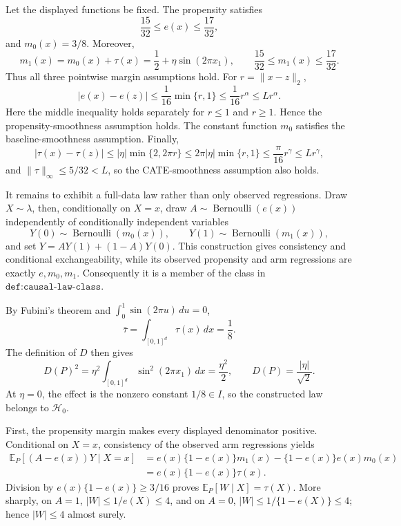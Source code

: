 Let the displayed functions be fixed. The propensity satisfies
\[
  \frac{15}{32}\le e(x)\le\frac{17}{32},
\]
and \(m_0(x)=3/8\). Moreover,
\[
  m_1(x)=m_0(x)+\tau(x)=\frac12+\eta\sin(2\pi x_1),
  \qquad
  \frac{15}{32}\le m_1(x)\le\frac{17}{32}.
\]
Thus all three pointwise margin assumptions hold. For \(r=\lVert x-z\rVert_2\),
\[
 |e(x)-e(z)|\le \frac1{16}\min\{r,1\}\le \frac1{16}r^\alpha\le Lr^\alpha.
\]
Here the middle inequality holds separately for \(r\le1\) and \(r\ge1\). Hence the propensity-smoothness assumption holds. The constant function \(m_0\) satisfies the baseline-smoothness assumption. Finally,
\[
 |\tau(x)-\tau(z)|
 \le |\eta|\min\{2,2\pi r\}
 \le 2\pi|\eta|\min\{r,1\}
 \le \frac{\pi}{16}r^\gamma
 \le Lr^\gamma,
\]
and \(\lVert\tau\rVert_\infty\le5/32<L\), so the CATE-smoothness assumption also holds.

It remains to exhibit a full-data law rather than only observed regressions. Draw \(X\sim\lambda\), then, conditionally on \(X=x\), draw \(A\sim\operatorname{Bernoulli}(e(x))\) independently of conditionally independent variables
\[
 Y(0)\sim\operatorname{Bernoulli}(m_0(x)),
 \qquad
 Y(1)\sim\operatorname{Bernoulli}(m_1(x)),
\]
and set \(Y=AY(1)+(1-A)Y(0)\). This construction gives consistency and conditional exchangeability, while its observed propensity and arm regressions are exactly \(e,m_0,m_1\). Consequently it is a member of the class in \(\texttt{def:causal-law-class}\).

By Fubini's theorem and \(\int_0^1\sin(2\pi u)\,du=0\),
\[
 \bar\tau=\int_{[0,1]^d}\tau(x)\,dx=\frac18.
\]
The definition of \(D\) then gives
\[
 D(P)^2
 =\eta^2\int_{[0,1]^d}\sin^2(2\pi x_1)\,dx
 =\frac{\eta^2}{2},
 \qquad
 D(P)=\frac{|\eta|}{\sqrt2}.
\]
At \(\eta=0\), the effect is the nonzero constant \(1/8\in I\), so the constructed law belongs to \(\mathcal H_0\).

First, the propensity margin makes every displayed denominator positive. Conditional on \(X=x\), consistency of the observed arm regressions yields
\[
 \begin{aligned}
 \mathbb E_P[(A-e(x))Y\mid X=x]
 &=e(x)\{1-e(x)\}m_1(x)
   -\{1-e(x)\}e(x)m_0(x)\\
 &=e(x)\{1-e(x)\}\tau(x).
 \end{aligned}
\]
Division by \(e(x)\{1-e(x)\}\ge3/16\) proves \(\mathbb E_P[W\mid X]=\tau(X)\). More sharply, on \(A=1\), \(|W|\le1/e(X)\le4\), and on \(A=0\), \(|W|\le1/\{1-e(X)\}\le4\); hence \(|W|\le4\) almost surely.


